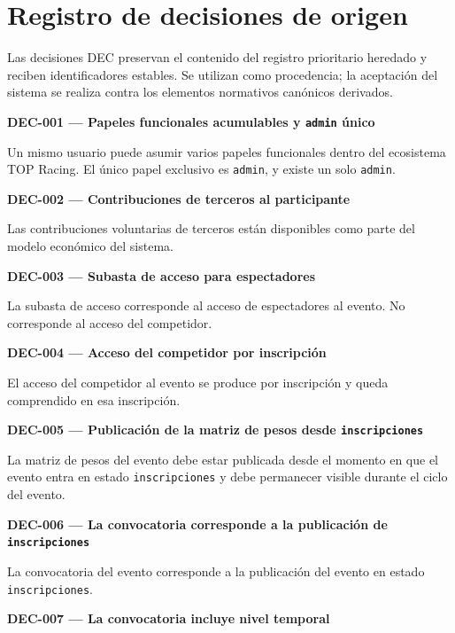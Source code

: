 \documentclass[10pt,letterpaper]{article}
\begin{document}
\section{Registro de decisiones de origen}
Las decisiones DEC preservan el contenido del registro prioritario heredado y reciben identificadores estables. Se utilizan como procedencia; la aceptación del sistema se realiza contra los elementos normativos canónicos derivados.

\noindent\textbf{DEC-001 --- Papeles funcionales acumulables y \texttt{admin} único}\par
Un mismo usuario puede asumir varios papeles funcionales dentro del ecosistema TOP Racing. El único papel exclusivo es \texttt{admin}, y existe un solo \texttt{admin}.\par\vspace{0.45em}
\noindent\textbf{DEC-002 --- Contribuciones de terceros al participante}\par
Las contribuciones voluntarias de terceros están disponibles como parte del modelo económico del sistema.\par\vspace{0.45em}
\noindent\textbf{DEC-003 --- Subasta de acceso para espectadores}\par
La subasta de acceso corresponde al acceso de espectadores al evento. No corresponde al acceso del competidor.\par\vspace{0.45em}
\noindent\textbf{DEC-004 --- Acceso del competidor por inscripción}\par
El acceso del competidor al evento se produce por inscripción y queda comprendido en esa inscripción.\par\vspace{0.45em}
\noindent\textbf{DEC-005 --- Publicación de la matriz de pesos desde \texttt{inscripciones}}\par
La matriz de pesos del evento debe estar publicada desde el momento en que el evento entra en estado \texttt{inscripciones} y debe permanecer visible durante el ciclo del evento.\par\vspace{0.45em}
\noindent\textbf{DEC-006 --- La convocatoria corresponde a la publicación de \texttt{inscripciones}}\par
La convocatoria del evento corresponde a la publicación del evento en estado \texttt{inscripciones}.\par\vspace{0.45em}
\noindent\textbf{DEC-007 --- La convocatoria incluye nivel temporal}\par
\end{document}
